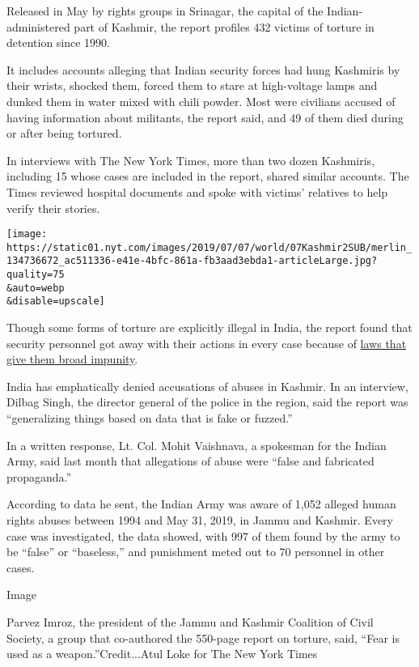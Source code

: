 Released in May by rights groups in Srinagar, the capital of the
Indian-administered part of Kashmir, the report profiles 432 victims of
torture in detention since 1990.

It includes accounts alleging that Indian security forces had hung
Kashmiris by their wrists, shocked them, forced them to stare at
high-voltage lamps and dunked them in water mixed with chili powder.
Most were civilians accused of having information about militants, the
report said, and 49 of them died during or after being tortured.

In interviews with The New York Times, more than two dozen Kashmiris,
including 15 whose cases are included in the report, shared similar
accounts. The Times reviewed hospital documents and spoke with victims'
relatives to help verify their stories.

\texttt{[image: https://static01.nyt.com/images/2019/07/07/world/07Kashmir2SUB/merlin\_134736672\_ac511336-e41e-4bfc-861a-fb3aad3ebda1-articleLarge.jpg?quality=75\\\&auto=webp\\\&disable=upscale]}

Though some forms of torture are explicitly illegal in India, the report
found that security personnel got away with their actions in every case
because of
\href{https://www.indiatoday.in/india/story/afspa-disagreement-jammu-and-kashmir-armed-militancy-cmp-bjp-pdp-281441-2015-07-09}{laws
that give them broad impunity}.

India has emphatically denied accusations of abuses in Kashmir. In an
interview, Dilbag Singh, the director general of the police in the
region, said the report was ``generalizing things based on data that is
fake or fuzzed.''

In a written response, Lt. Col. Mohit Vaishnava, a spokesman for the
Indian Army, said last month that allegations of abuse were ``false and
fabricated propaganda.''

According to data he sent, the Indian Army was aware of 1,052 alleged
human rights abuses between 1994 and May 31, 2019, in Jammu and Kashmir.
Every case was investigated, the data showed, with 997 of them found by
the army to be ``false'' or ``baseless,'' and punishment meted out to 70
personnel in other cases.

Image

Parvez Imroz, the president of the Jammu and Kashmir Coalition of Civil
Society, a group that co-authored the 550-page report on torture, said,
``Fear is used as a weapon.''Credit...Atul Loke for The New York Times

